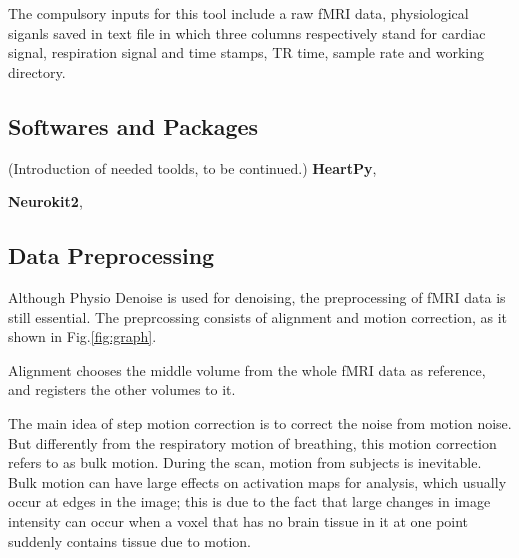 The compulsory inputs for this tool include a raw fMRI data, 
physiological siganls saved in text file in which three columns respectively stand for cardiac signal, 
respiration signal and time stamps,
TR time, sample rate and working directory.

\subsection{Softwares and Packages}

(Introduction of needed toolds, to be continued.)
\textbf{HeartPy}\cite{van2019heartpy},

\textbf{Neurokit2}\cite{Makowski2021neurokit},

\subsection{Data Preprocessing}

Although Physio Denoise is used for denoising, the preprocessing of fMRI data is still essential.
The preprcossing consists of alignment and motion correction, as it shown in Fig.\ref{fig:graph}.

Alignment chooses the middle volume from the whole fMRI data as reference, and registers the other
volumes to it.

The main idea of step motion correction is to correct the noise from motion noise. 
But differently from the respiratory motion of breathing, this motion correction
refers to as bulk motion. During the scan, motion from subjects is inevitable.
Bulk motion can have large effects on activation maps for analysis, 
which usually occur at edges in the image; 
this is due to the fact that large changes in image intensity can occur 
when a voxel that has no brain tissue in it at one point 
suddenly contains tissue due to motion.\cite{poldrack2011handbook}


